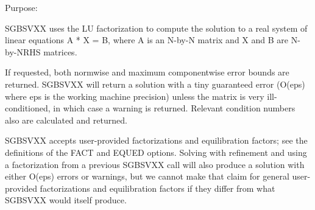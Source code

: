 \begin{DoxyParagraph}{Purpose\+: }
\begin{DoxyVerb}    SGBSVXX uses the LU factorization to compute the solution to a
    real system of linear equations  A * X = B,  where A is an
    N-by-N matrix and X and B are N-by-NRHS matrices.

    If requested, both normwise and maximum componentwise error bounds
    are returned. SGBSVXX will return a solution with a tiny
    guaranteed error (O(eps) where eps is the working machine
    precision) unless the matrix is very ill-conditioned, in which
    case a warning is returned. Relevant condition numbers also are
    calculated and returned.

    SGBSVXX accepts user-provided factorizations and equilibration
    factors; see the definitions of the FACT and EQUED options.
    Solving with refinement and using a factorization from a previous
    SGBSVXX call will also produce a solution with either O(eps)
    errors or warnings, but we cannot make that claim for general
    user-provided factorizations and equilibration factors if they
    differ from what SGBSVXX would itself produce.\end{DoxyVerb}
 
\end{DoxyParagraph}

